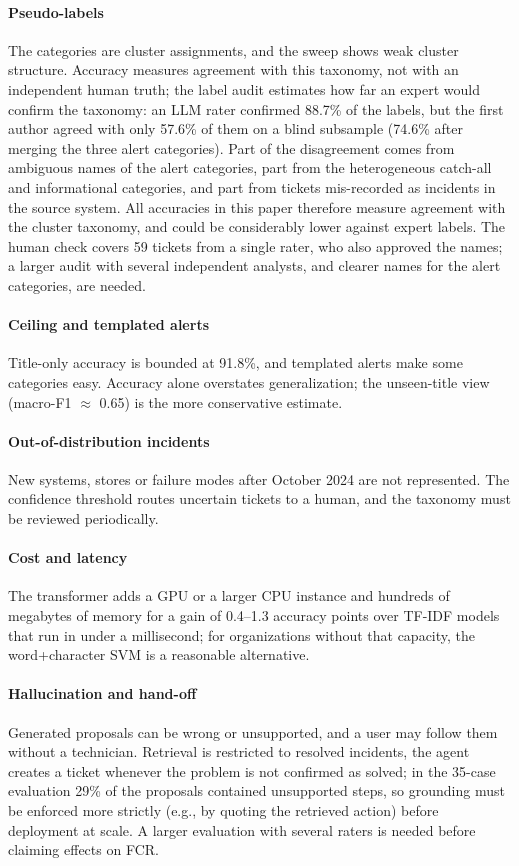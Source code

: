 \documentclass[conference]{IEEEtran}
\begin{document}
\paragraph{Pseudo-labels} The categories are cluster assignments, and the sweep shows weak cluster structure.
Accuracy measures agreement with this taxonomy, not with an independent human truth; the label audit estimates
how far an expert would confirm the taxonomy: an LLM rater confirmed 88.7\% of the labels, but the first author agreed
with only 57.6\% of them on a blind subsample (74.6\% after merging the three alert categories). Part of the
disagreement comes from ambiguous names of the alert categories, part from the heterogeneous catch-all and
informational categories, and part from tickets mis-recorded as incidents in the source system. All accuracies
in this paper therefore measure agreement with the cluster taxonomy, and could be considerably lower against
expert labels. The human check covers 59 tickets from a single rater, who also approved the names; a larger audit
with several independent analysts, and clearer names for the alert categories, are needed.

\paragraph{Ceiling and templated alerts} Title-only accuracy is bounded at 91.8\%, and templated alerts make some
categories easy. Accuracy alone overstates generalization; the unseen-title view (macro-F1 $\approx$ 0.65) is the
more conservative estimate.

\paragraph{Out-of-distribution incidents} New systems, stores or failure modes after October 2024 are not
represented. The confidence threshold routes uncertain tickets to a human, and the taxonomy must be reviewed
periodically.

\paragraph{Cost and latency} The transformer adds a GPU or a larger CPU instance and hundreds of megabytes of
memory for a gain of 0.4--1.3 accuracy points over TF-IDF models that run in under a millisecond; for
organizations without that capacity, the word+character SVM is a reasonable alternative.

\paragraph{Hallucination and hand-off} Generated proposals can be wrong or unsupported, and a user may follow
them without a technician. Retrieval is restricted to resolved incidents, the agent creates a ticket whenever the
problem is not confirmed as solved; in the 35-case evaluation 29\% of the proposals contained unsupported steps,
so grounding must be enforced more strictly (e.g., by quoting the retrieved action) before deployment at scale. A larger evaluation with several raters is needed before claiming effects on FCR.
\end{document}
